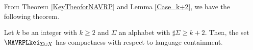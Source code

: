 From Theorem \ref{KeyTheoforNAVRP} and Lemma \ref{Case_k+2}, 
we have the following theorem.

\begin{thm}\label{MainTheforNAVRP}
{\color{black}Let $k$ be an integer with $k\ge 2$ and $\Sigma$ an alphabet with $\sharp\Sigma \ge k+2$.}
Then, the set {\color{black}$\NAVRPLkei_{\Sigma\cup X}$} has compactness with respect to {\color{black} language }containment.
\end{thm}